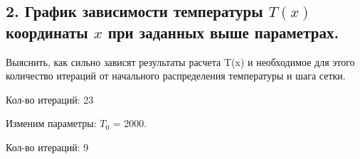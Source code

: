 \documentclass[a4paper,oneside,12pt]{extreport}
\begin{document}





\clearpage

\subsection{2. График зависимости температуры $T(x)$ координаты $x$ при заданных выше параметрах.}
Выяснить, как сильно зависят результаты расчета T(x) и необходимое для
этого количество итераций от начального распределения температуры и шага сетки. 

\begin{figure}[ht!]
\end{figure}
Кол-во итераций: 23

Изменим параметры: $T_0$ = 2000. 

\begin{figure}[ht!]
\end{figure}
Кол-во итераций: 9
\end{document}
